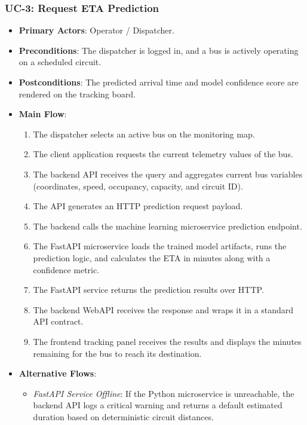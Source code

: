 \subsubsection{UC-3: Request ETA Prediction}
\begin{itemize}
  \item \textbf{Primary Actors}: Operator / Dispatcher.
  \item \textbf{Preconditions}: The dispatcher is logged in, and a bus is actively operating on a scheduled circuit.
  \item \textbf{Postconditions}: The predicted arrival time and model confidence score are rendered on the tracking board.
  \item \textbf{Main Flow}:
  \begin{enumerate}
    \item The dispatcher selects an active bus on the monitoring map.
    \item The client application requests the current telemetry values of the bus.
    \item The backend API receives the query and aggregates current bus variables (coordinates, speed, occupancy, capacity, and circuit ID).
    \item The API generates an HTTP prediction request payload.
    \item The backend calls the machine learning microservice prediction endpoint.
    \item The FastAPI microservice loads the trained model artifacts, runs the prediction logic, and calculates the ETA in minutes along with a confidence metric.
    \item The FastAPI service returns the prediction results over HTTP.
    \item The backend WebAPI receives the response and wraps it in a standard API contract.
    \item The frontend tracking panel receives the results and displays the minutes remaining for the bus to reach its destination.
  \end{enumerate}
  \item \textbf{Alternative Flows}:
  \begin{itemize}
    \item \emph{FastAPI Service Offline}: If the Python microservice is unreachable, the backend API logs a critical warning and returns a default estimated duration based on deterministic circuit distances.
  \end{itemize}
\end{itemize}

